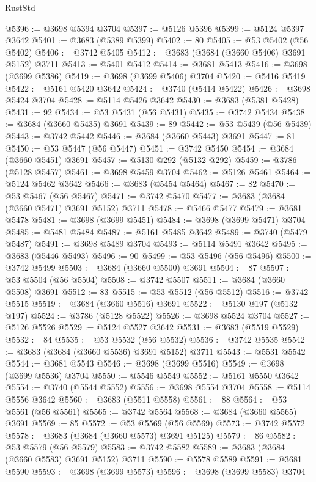\begin{lexlean}{RustStd}
\begin{coremodule}
@5396 := @3698 @5394 @3704
@5397 := @5126 @5396
@5399 := @5124 @5397 @3642
@5401 := @3683 (@5389 @5399)
@5402 := 80
@5405 := @53 @5402 (@56 @5402)
@5406 := @3742 @5405
@5412 := @3683 (@3684 (@3660 @5406) @3691 @5152) @3711
@5413 := @5401 @5412
@5414 := @3681 @5413
@5416 := @3698 (@3699 @5386)
@5419 := @3698 (@3699 @5406) @3704
@5420 := @5416 @5419
@5422 := @5161 @5420 @3642
@5424 := @3740 (@5414 @5422)
@5426 := @3698 @5424 @3704
@5428 := @5114 @5426 @3642
@5430 := @3683 (@5381 @5428)
@5431 := 92
@5434 := @53 @5431 (@56 @5431)
@5435 := @3742 @5434
@5438 := @3684 (@3660 @5435) @3691
@5439 := 89
@5442 := @53 @5439 (@56 @5439)
@5443 := @3742 @5442
@5446 := @3684 (@3660 @5443) @3691
@5447 := 81
@5450 := @53 @5447 (@56 @5447)
@5451 := @3742 @5450
@5454 := @3684 (@3660 @5451) @3691
@5457 := @5130 @292 (@5132 @292)
@5459 := @3786 (@5128 @5457)
@5461 := @3698 @5459 @3704
@5462 := @5126 @5461
@5464 := @5124 @5462 @3642
@5466 := @3683 (@5454 @5464)
@5467 := 82
@5470 := @53 @5467 (@56 @5467)
@5471 := @3742 @5470
@5477 := @3683 (@3684 (@3660 @5471) @3691 @5152) @3711
@5478 := @5466 @5477
@5479 := @3681 @5478
@5481 := @3698 (@3699 @5451)
@5484 := @3698 (@3699 @5471) @3704
@5485 := @5481 @5484
@5487 := @5161 @5485 @3642
@5489 := @3740 (@5479 @5487)
@5491 := @3698 @5489 @3704
@5493 := @5114 @5491 @3642
@5495 := @3683 (@5446 @5493)
@5496 := 90
@5499 := @53 @5496 (@56 @5496)
@5500 := @3742 @5499
@5503 := @3684 (@3660 @5500) @3691
@5504 := 87
@5507 := @53 @5504 (@56 @5504)
@5508 := @3742 @5507
@5511 := @3684 (@3660 @5508) @3691
@5512 := 83
@5515 := @53 @5512 (@56 @5512)
@5516 := @3742 @5515
@5519 := @3684 (@3660 @5516) @3691
@5522 := @5130 @197 (@5132 @197)
@5524 := @3786 (@5128 @5522)
@5526 := @3698 @5524 @3704
@5527 := @5126 @5526
@5529 := @5124 @5527 @3642
@5531 := @3683 (@5519 @5529)
@5532 := 84
@5535 := @53 @5532 (@56 @5532)
@5536 := @3742 @5535
@5542 := @3683 (@3684 (@3660 @5536) @3691 @5152) @3711
@5543 := @5531 @5542
@5544 := @3681 @5543
@5546 := @3698 (@3699 @5516)
@5549 := @3698 (@3699 @5536) @3704
@5550 := @5546 @5549
@5552 := @5161 @5550 @3642
@5554 := @3740 (@5544 @5552)
@5556 := @3698 @5554 @3704
@5558 := @5114 @5556 @3642
@5560 := @3683 (@5511 @5558)
@5561 := 88
@5564 := @53 @5561 (@56 @5561)
@5565 := @3742 @5564
@5568 := @3684 (@3660 @5565) @3691
@5569 := 85
@5572 := @53 @5569 (@56 @5569)
@5573 := @3742 @5572
@5578 := @3683 (@3684 (@3660 @5573) @3691 @5125)
@5579 := 86
@5582 := @53 @5579 (@56 @5579)
@5583 := @3742 @5582
@5589 := @3683 (@3684 (@3660 @5583) @3691 @5152) @3711
@5590 := @5578 @5589
@5591 := @3681 @5590
@5593 := @3698 (@3699 @5573)
@5596 := @3698 (@3699 @5583) @3704

\end{coremodule}
\end{lexlean}
